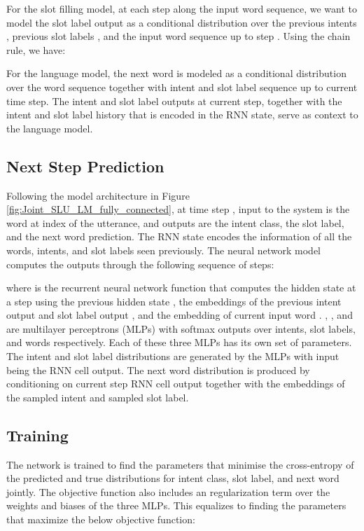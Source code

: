 \documentclass[11pt]{article}
\begin{document}
    For the slot filling model, at each step  along the input word sequence, we want to model the slot label output  as a conditional distribution over the previous intents , previous slot labels , and the input word sequence up to step . Using the chain rule, we have:
        
    For the language model, the next word is modeled as a conditional distribution over the word sequence together with intent and slot label sequence up to current time step. The intent and slot label outputs at current step, together with the intent and slot label history that is encoded in the RNN state, serve as context to the language model. 
        
\subsection{Next Step Prediction}
    Following the model architecture in Figure \ref{fig:Joint_SLU_LM_fully_connected}, at time step , input to the system is the word at index  of the utterance, and outputs are the intent class, the slot label, and the next word prediction. The RNN state  encodes the information of all the words, intents, and slot labels seen previously. The neural network model computes the outputs through the following sequence of steps:
        
    where  is the recurrent neural network function that computes the hidden state  at a step using the previous hidden state , the embeddings of the previous intent output  and slot label output , and the embedding of current input word . , , and  are multilayer perceptrons (MLPs) with softmax outputs over intents, slot labels, and words respectively. Each of these three MLPs has its own set of parameters. The intent and slot label distributions are generated by the MLPs with input being the RNN cell output. The next word distribution is produced by conditioning on current step RNN cell output together with the embeddings of the sampled intent and  sampled slot label.

\subsection{Training}
    The network is trained to find the parameters  that minimise the cross-entropy of the predicted and true distributions for intent class, slot label, and next word jointly. The objective function also includes an  regularization term  over the weights and biases of the three MLPs. This equalizes to finding the parameters  that maximize the below objective function:
        
\end{document}
